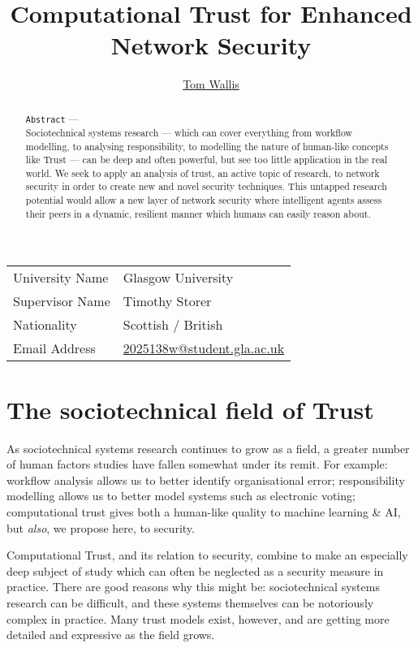 \documentclass{tufte-handout}
\title{Computational Trust for Enhanced Network Security}
\author[Tom Wallis]{\href{http://tomwallis.net}{Tom Wallis}}
\date{}  %
\begin{document}
\maketitle%

\bigskip

\begin{rightflush}
\begin{tabular}{l l}
    University Name & Glasgow University\\
    Supervisor Name & Timothy Storer \\
    Nationality & Scottish / British \\
    Email Address & \href{mailto:2025138w@student.gla.ac.uk}{2025138w@student.gla.ac.uk} \\
\end{tabular}
\end{rightflush}

\bigskip

\begin{abstract}
\texttt{Abstract} ---\\
Sociotechnical systems research --- which can cover everything from workflow modelling, to analysing responsibility, to modelling the nature of human-like concepts like Trust --- can be deep and often powerful, but see too little application in the real world. We seek to apply an analysis of trust, an active topic of research, to network security in order to create new and novel security techniques. This untapped research potential would allow a new layer of network security where intelligent agents assess their peers in a dynamic, resilient manner which humans can easily reason about.
\end{abstract}

\newpage

\section{The sociotechnical field of Trust}
As sociotechnical systems research continues to grow as a field, a greater number of human factors studies have fallen somewhat under its remit. For example: workflow analysis allows us to better identify organisational error; responsibility modelling allows us to better model systems such as electronic voting; computational trust gives both a human-like quality to machine learning \& AI, but \emph{also}, we propose here, to security.\par
Computational Trust, and its relation to security, combine to make an especially deep subject of study which can often be neglected as a security measure in practice. There are good reasons why this might be: sociotechnical systems research can be difficult, and these systems themselves can be notoriously complex in practice.\cite{Crabtree2000} Many trust models exist, however, and are getting more detailed and expressive as the field grows.\par
\end{document}
